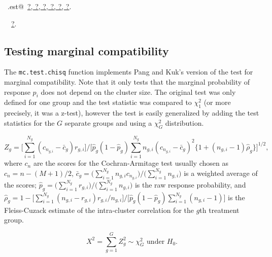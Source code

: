 \documentclass[reqno]{amsart}
\renewcommand{\NWlink}[2]{\hyperlink{#1}{#2}}
\begin{document}
\begin{flushleft}
\begin{list}{}{\setlength{\itemsep}{-\parsep}\setlength{\itemindent}{-\leftmargin}}
\item \NWtxtIdentsDefed\nobreak\  \verb@mc.est@\nobreak\ \NWlink{nuweb?}{?}\NWlink{nuweb?}{, ?}\NWlink{nuweb?}{, ?}\NWlink{nuweb?}{, ?}\NWlink{nuweb?}{, ?}\NWlink{nuweb?}{, ?}.\item \NWtxtIdentsUsed\nobreak\  \verb@ReprodEstimates@\nobreak\ \NWlink{nuweb?}{?}.
\item{}
\end{list}
\vspace{4ex}
\end{flushleft}
\subsection{Testing marginal compatibility}
The \texttt{mc.test.chisq} function implements Pang and Kuk's version of
the test for marginal compatibility. Note that it only tests that the marginal probability of 
response $p_i$ does not depend on the cluster size. The original test was only
defined for one group and the test statistic was compared to $\chi^2_1$ (or more
precisely, it was a z-test), however the test is easily generalized by adding 
the test statistics for the $G$ separate groups and using a $\chi^2_G$ distribution.

\begin{equation}
Z_g = \Big[\sum_{i=1}^{N_g} (c_{n_{g,i}} - \bar{c}_g) r_{g,i}\Big] \bigg/
  \Big[\hat{p}_g(1-\hat{p}_g)\sum_{i=1}^{N_g}n_{g,i}(c_{n_{g,i}} - \bar{c}_g)^2 \{1+(n_{g,i}-1)\hat{\rho}_g\}\Big]^{1/2},
\end{equation}
where $c_n$ are the scores for the Cochran-Armitage test usually chosen as $c_n=n-(M+1)/2$, 
$\bar{c}_g=\big(\sum_{i=1}^{N_g}n_{g,i}c_{n_{g,i}}\big) \big/ \big(\sum_{i=1}^{N_g}n_{g,i}\big)$ is a weighted
average of the scores; $\hat{p}_g=\big(\sum_{i=1}^{N_g}r_{g,i}\big) \big/ \big(\sum_{i=1}^{N_g}n_{g,i}\big)$ 
is the raw response probability, and 
$\hat{\rho}_g=1-\big[\sum_{i=1}^{N_g}(n_{g,i}-r_{g,i})r_{g,i}/n_{g,i}\big] \big/ 
\big[\hat{p}_g(1-\hat{p}_g)\sum_{i=1}^{N_g}(n_{g,i}-1)\big]$ is the Fleiss-Cuzack estimate of the intra-cluster
correlation for the $g$th treatment group. 

\begin{equation}
X^2=\sum_{g=1}^G Z_g^2 \sim \chi^2_G \text{ under }H_0.
\end{equation}
\end{document}
